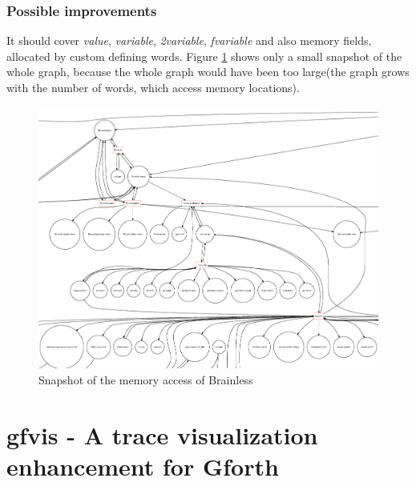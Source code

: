 \subsubsection*{Possible improvements}

It should cover \emph{value}, \emph{variable}, \emph{2variable}, \emph{fvariable} and also memory fields, allocated by custom defining words. Figure \ref{fig:taxonomy} shows only a small snapshot of the whole graph, because the whole graph would have been too large(the graph grows with the number of words, which access memory locations).

\begin{figure}[p]
    \centering
    \includegraphics[scale=0.20]{graphics/taxonomy_view2.png}
    \caption{Snapshot of the memory access of Brainless}
    \label{fig:taxonomy}
\end{figure}

\section{gfvis - A trace visualization enhancement for Gforth}

